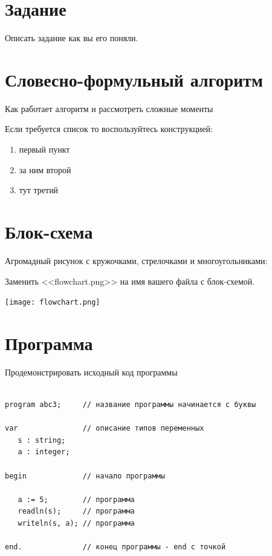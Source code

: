 \section{Задание}
Описать задание как вы его поняли.

\section{Словесно-формульный алгоритм}
Как работает алгоритм и рассмотреть сложные моменты

Если требуется список то воспользуйтесь конструкцией:
\begin{enumerate} %
\item первый пункт
\item за ним второй
\item тут третий
\end{enumerate} %

\section{Блок-схема}
Агромадный рисунок с кружочками, стрелочками и многоугольниками:

Заменить <<flowchart.png>> на имя вашего файла с блок-схемой.

\texttt{[image: flowchart.png]}

\section{Программа}
Продемонстрировать исходный код программы

\begin{lstlisting}

program abc3;     // название программы начинается с буквы

var               // описание типов переменных
   s : string;
   a : integer;

begin             // начало программы

   a := 5;        // программа
   readln(s);     // программа
   writeln(s, a); // программа
   
end.              // конец программы - end с точкой

\end{lstlisting}



%


